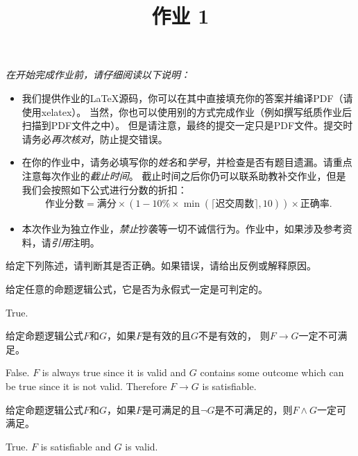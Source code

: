 \documentclass[11pt,a4paper]{article}
\title{作业 1}
\begin{document}
\maketitle

\textit{在开始完成作业前，请仔细阅读以下说明：}
\begin{itemize}
    \item 我们提供作业的\LaTeX 源码，你可以在其中直接填充你的答案并编译PDF（请使用xelatex）。
    当然，你也可以使用别的方式完成作业（例如撰写纸质作业后扫描到PDF文件之中）。
    但是请注意，最终的提交一定只是PDF文件。提交时请务必\emph{再次核对}，防止提交错误。
    \item 在你的作业中，请务必填写你的\emph{姓名}和\emph{学号}，并检查是否有题目遗漏。请重点注意每次作业的\emph{截止时间}。
    截止时间之后你仍可以联系助教补交作业，但是我们会按照如下公式进行分数的折扣：
    \begin{align*}
        \text{作业分数} = \text{满分}\times\left(1 - 10\%\times\min\left(\lceil\text{迟交周数}\rceil, 10\right)\right)\times\text{正确率}.
    \end{align*}
    \item 本次作业为独立作业，\emph{禁止}抄袭等一切不诚信行为。作业中，如果涉及参考资料，请\emph{引用}注明。
\end{itemize}



给定下列陈述，请判断其是否正确。如果错误，请给出反例或解释原因。

\subproblem 给定任意的命题逻辑公式，它是否为永假式一定是可判定的。

\begin{solution}
    True.
\end{solution}

\subproblem 给定命题逻辑公式$F$和$G$，如果$F$是有效的且$G$不是有效的，
则$F\rightarrow G$一定不可满足。

\begin{solution}
    False.
    $F$ is always true since it is valid and $G$ contains some outcome which can be true since it is not valid. Therefore $F \rightarrow G$ is satisfiable.
\end{solution}

\subproblem 给定命题逻辑公式$F$和$G$，如果$F$是可满足的且$\neg G$是不可满足的，则$F\wedge G$一定可满足。

\begin{solution}
    True.
    $F$ is satisfiable and $G$ is valid. 
\end{solution}
\end{document}
